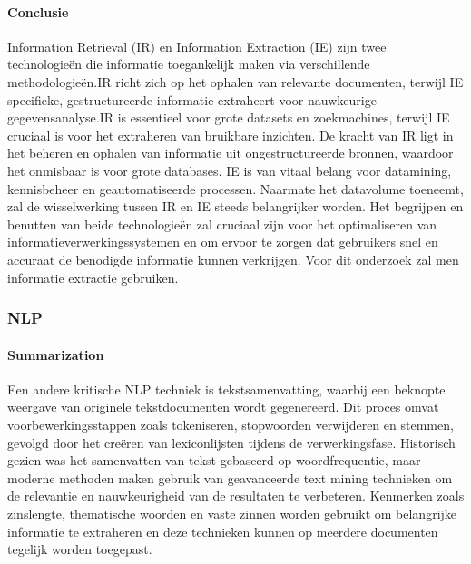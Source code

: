  \paragraph{Conclusie}
 Information Retrieval (IR) en Information Extraction (IE) zijn twee technologieën die informatie toegankelijk maken via verschillende methodologieën.IR richt zich op het ophalen van relevante documenten, terwijl IE specifieke, gestructureerde informatie extraheert voor nauwkeurige gegevensanalyse.IR is essentieel voor grote datasets en zoekmachines, terwijl IE cruciaal is voor het extraheren van bruikbare inzichten. De kracht van IR ligt in het beheren en ophalen van informatie uit ongestructureerde bronnen, waardoor het onmisbaar is voor grote databases. IE is van vitaal belang voor datamining, kennisbeheer en geautomatiseerde processen. Naarmate het datavolume toeneemt, zal de wisselwerking tussen IR en IE steeds belangrijker worden. Het begrijpen en benutten van beide technologieën zal cruciaal zijn voor het optimaliseren van informatieverwerkingssystemen en om ervoor te zorgen dat gebruikers snel en accuraat de benodigde informatie kunnen verkrijgen. Voor dit onderzoek zal men informatie extractie gebruiken.
 
\subsubsection{NLP}
\paragraph{Summarization}

Een andere kritische NLP techniek is tekstsamenvatting, waarbij een beknopte weergave van originele tekstdocumenten wordt gegenereerd. Dit proces omvat voorbewerkingsstappen zoals tokeniseren, stopwoorden verwijderen en stemmen, gevolgd door het creëren van lexiconlijsten tijdens de verwerkingsfase. Historisch gezien was het samenvatten van tekst gebaseerd op woordfrequentie, maar moderne methoden maken gebruik van geavanceerde text mining technieken om de relevantie en nauwkeurigheid van de resultaten te verbeteren. Kenmerken zoals zinslengte, thematische woorden en vaste zinnen worden gebruikt om belangrijke informatie te extraheren en deze technieken kunnen op meerdere documenten tegelijk worden toegepast\autocite{Talib2016TextMining}.

